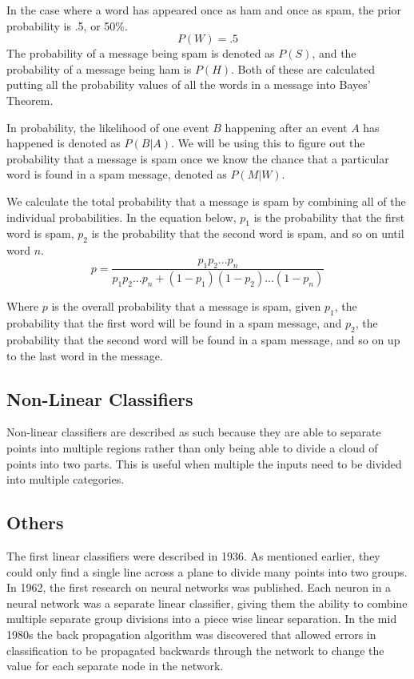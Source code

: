 \documentclass[12pt]{article}
\begin{document}
In the case where a word has appeared once as ham and once as spam, the prior probability is .5, or 50\%.
$$P(W) = .5$$
The probability of a message being spam is denoted as $P(S)$, and the probability of a message being ham is
$P(H)$. Both of these are calculated putting all the probability values of all the words in a message into
Bayes' Theorem.

In probability, the likelihood of one event $B$ happening after an event $A$ has happened is denoted as
$P(B|A)$. We will be using this to figure out the probability that a message is spam once we know the chance
that a particular word is found in a spam message, denoted as $P(M|W)$.

We calculate the total probability that a message is spam by combining all of the individual probabilities.
In the equation below, $p_{1}$ is the probability that the first word is spam, $p_{2}$ is the probability that
the second word is spam, and so on until word $n$.
$$p=\dfrac{p_{1}p_{2} ... p_{n}}{p_{1}p_{2} ... p_{n} + (1-p_{1})(1-p_{2}) ... (1-p_{n})}$$

Where $p$ is the overall probability that a message is spam, given $p_{1}$, the probability that the first
word will be found in a spam message, and $p_{2}$, the probability that the second word will be found in a
spam message, and so on up to the last word in the message.


\subsection{Non-Linear Classifiers}
Non-linear classifiers are described as such because they are able to separate points into multiple regions
rather than only being able to divide a cloud of points into two parts. This is useful when multiple the
inputs need to be divided into multiple categories.
\subsection{Others}
The first linear classifiers were described in 1936. \cite{fisher1936use} As mentioned earlier, they could
only find a single line across a plane to divide many points into two groups.  In 1962, the first research on
neural networks was published. Each neuron in a neural network was a separate linear classifier, giving them
the ability to combine multiple separate group divisions into a piece wise linear separation. In the mid 1980s
the back propagation algorithm was discovered that allowed errors in classification to be propagated backwards
through the network to change the value for each separate node in the network. \cite{cortes1995support}
\end{document}
